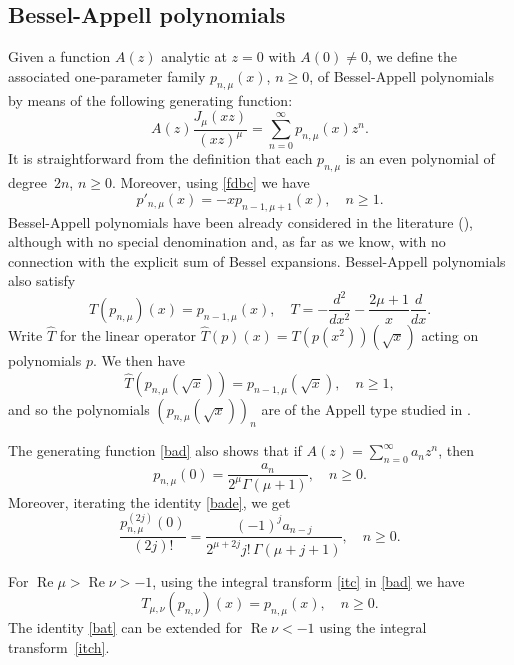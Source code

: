 \documentclass[12pt,leqno]{amsart}
\numberwithin{equation}{section}
\theoremstyle{plain}
\renewcommand{\Re}{\operatorname{Re}}
\begin{document}
\subsection{Bessel-Appell polynomials}

Given a function $A(z)$ analytic at $z=0$ with $A(0)\not =0$, we define the associated one-parameter family $p_{n,\mu}(x)$, $n\ge 0$, of Bessel-Appell polynomials by means of the following generating function:
\begin{equation}
\label{bad}
A(z)\frac{J_\mu(xz)}{(xz)^\mu} = \sum_{n=0}^\infty p_{n,\mu}(x)z^n.
\end{equation}
It is straightforward from the definition that each $p_{n,\mu}$ is an even polynomial of degree~$2n$, $n\ge 0$. Moreover, using \eqref{fdbc} we have
\begin{equation}
\label{bade}
p'_{n,\mu}(x) = -xp_{n-1,\mu+1}(x),\quad n\ge 1.
\end{equation}
Bessel-Appell polynomials have been already considered in the literature (\cite{Cho}), although with no special denomination and, as far as we know, with no connection with the explicit sum of Bessel expansions. Bessel-Appell polynomials also satisfy
\[
T(p_{n,\mu})(x) = p_{n-1,\mu}(x),
\quad 
T = -\frac{d^2}{dx^2}-\frac{2\mu+1}{x}\frac{d}{dx}.
\]
Write $\hat T$ for the linear operator $\hat T(p)(x)=T(p(x^2))(\sqrt x)$ acting on polynomials $p$. We then have
\[
\hat T(p_{n,\mu}(\sqrt x)) = p_{n-1,\mu}(\sqrt x),\quad n\ge 1,
\]
and so the polynomials $(p_{n,\mu}(\sqrt x))_n$ are of the Appell type studied in \cite[Chap.~10]{Ism}.

The generating function \eqref{bad} also shows that if $A(z)= \sum _{n=0}^\infty a_nz^n$, then
\begin{equation}
\label{ba0}
p_{n,\mu}(0) = \frac{a_n}{2^\mu\Gamma(\mu+1)},
\quad n\ge 0.
\end{equation}
Moreover, iterating the identity \eqref{bade}, we get
\begin{equation}
\label{baj}
\frac{p^{(2j)}_{n,\mu}(0)}{(2j)!}
= \frac{(-1)^ja_{n-j}}{2^{\mu+2j}j!\,\Gamma(\mu+j+1)},
\quad n\ge 0.
\end{equation}

For $\Re \mu>\Re\nu>-1$, using the integral transform \eqref{itc} in \eqref{bad} we have
\begin{equation}
\label{bat}
T_{\mu,\nu}(p_{n,\nu})(x)=p_{n,\mu}(x),\quad n\ge 0.
\end{equation}
The identity \eqref{bat} can be extended for $\Re \nu<-1$ using the integral transform~\eqref{itch}.
\end{document}

